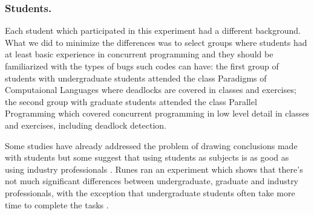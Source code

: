 \subsubsection{Students.}

Each student which participated in this experiment had a different background. What we did to minimize the differences was to select groups where students had at least basic experience in concurrent programming and they should be familiarized with the types of bugs such codes can have: the first group of students with undergraduate students attended the class Paradigms of Computaional Languages where deadlocks are covered in classes and exercises; the second group with graduate students attended the class Parallel Programming which covered concurrent programming in low level detail in classes and exercises, including deadlock detection.

Some studies have already addressed the problem of drawing conclusions made with students but some suggest that using students as subjects is as good as using industry professionals \cite{staron}. Runes ran an experiment which shows that there's not much significant differences between undergraduate, graduate and industry professionals, with the exception that undergraduate students often take more time to complete the tasks \cite{runes}.




